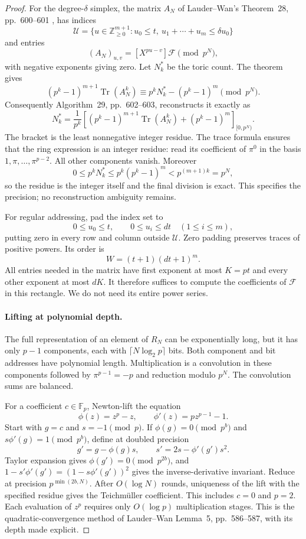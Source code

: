 \begin{proof}
For the degree-$\delta$ simplex, the matrix $A_N$ of Lauder--Wan's Theorem~28, pp.~600--601 \citep{LauderWan2008}, has indices
\[
 \mathcal U=\{u\in\mathbb Z_{\ge0}^{m+1}:u_0\le t,
                         \ u_1+\cdots+u_m\le\delta u_0\}
\]
and entries
\[
 (A_N)_{u,v}=[X^{pu-v}]\mathcal F\pmod{p^N},
\]
with negative exponents giving zero. Let $N_k^*$ be the toric count. The theorem gives
\[
 (p^k-1)^{m+1}\operatorname{Tr}(A_N^k)
 \equiv p^kN_k^*-(p^k-1)^m\pmod{p^N}.
\]
Consequently Algorithm~29, pp.~602--603, reconstructs it exactly as
\begin{equation}\label{eq:space-toric-count}
 N_k^*=\frac1{p^k}
 \left[(p^k-1)^{m+1}\operatorname{Tr}(A_N^k)
                         +(p^k-1)^m\right]_{[0,p^N)}.
\end{equation}
The bracket is the least nonnegative integer residue. The trace formula ensures that the ring expression is an integer residue: read its coefficient of $\pi^0$ in the basis $1,\pi,\ldots,\pi^{p-2}$. All other components vanish. Moreover
\[
 0\le p^kN_k^*\le p^k(p^k-1)^m<p^{(m+1)k}=p^N,
\]
so the residue is the integer itself and the final division is exact. This specifies the precision; no reconstruction ambiguity remains.

For regular addressing, pad the index set to
\[
 0\le u_0\le t,\qquad 0\le u_i\le dt\quad(1\le i\le m),
\]
putting zero in every row and column outside $\mathcal U$. Zero padding preserves traces of positive powers. Its order is
\[
 W=(t+1)(dt+1)^m.
\]
All entries needed in the matrix have first exponent at most $K=pt$ and every other exponent at most $dK$. It therefore suffices to compute the coefficients of $\mathcal F$ in this rectangle. We do not need its entire power series.

\paragraph{Lifting at polynomial depth.}
The full representation of an element of $R_N$ can be exponentially long, but it has only $p-1$ components, each with $\lceil N\log_2p\rceil$ bits. Both component and bit addresses have polynomial length. Multiplication is a convolution in these components followed by $\pi^{p-1}=-p$ and reduction modulo $p^N$. The convolution sums are balanced.

For a coefficient $c\in\mathbb F_p$, Newton-lift the equation
\[
 \phi(z)=z^p-z,
 \qquad \phi'(z)=pz^{p-1}-1.
\]
Start with $g=c$ and $s=-1\pmod p$. If $\phi(g)=0\pmod{p^b}$ and $s\phi'(g)=1\pmod{p^b}$, define at doubled precision
\[
 g'=g-\phi(g)s,\qquad s'=2s-\phi'(g')s^2.
\]
Taylor expansion gives $\phi(g')=0\pmod{p^{2b}}$, and
$1-s'\phi'(g')=(1-s\phi'(g'))^2$ gives the inverse-derivative invariant. Reduce at precision $p^{\min(2b,N)}$. After $O(\log N)$ rounds, uniqueness of the lift with the specified residue gives the Teichm\"uller coefficient. This includes $c=0$ and $p=2$. Each evaluation of $z^p$ requires only $O(\log p)$ multiplication stages. This is the quadratic-convergence method of Lauder--Wan Lemma~5, pp.~586--587, with its depth made explicit.


\end{proof}
